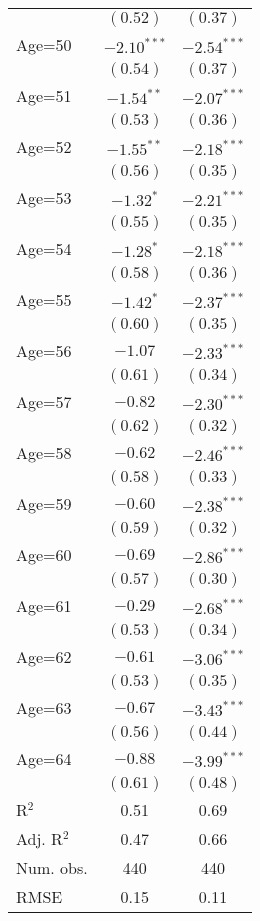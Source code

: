 \documentclass[fullpage]{paper}
\begin{document}
\begin{center}
\begin{longtable}{l c c }
            & $(0.52)$      & $(0.37)$      \\
Age=50      & $-2.10^{***}$ & $-2.54^{***}$ \\
            & $(0.54)$      & $(0.37)$      \\
Age=51      & $-1.54^{**}$  & $-2.07^{***}$ \\
            & $(0.53)$      & $(0.36)$      \\
Age=52      & $-1.55^{**}$  & $-2.18^{***}$ \\
            & $(0.56)$      & $(0.35)$      \\
Age=53      & $-1.32^{*}$   & $-2.21^{***}$ \\
            & $(0.55)$      & $(0.35)$      \\
Age=54      & $-1.28^{*}$   & $-2.18^{***}$ \\
            & $(0.58)$      & $(0.36)$      \\
Age=55      & $-1.42^{*}$   & $-2.37^{***}$ \\
            & $(0.60)$      & $(0.35)$      \\
Age=56      & $-1.07$       & $-2.33^{***}$ \\
            & $(0.61)$      & $(0.34)$      \\
Age=57      & $-0.82$       & $-2.30^{***}$ \\
            & $(0.62)$      & $(0.32)$      \\
Age=58      & $-0.62$       & $-2.46^{***}$ \\
            & $(0.58)$      & $(0.33)$      \\
Age=59      & $-0.60$       & $-2.38^{***}$ \\
            & $(0.59)$      & $(0.32)$      \\
Age=60      & $-0.69$       & $-2.86^{***}$ \\
            & $(0.57)$      & $(0.30)$      \\
Age=61      & $-0.29$       & $-2.68^{***}$ \\
            & $(0.53)$      & $(0.34)$      \\
Age=62      & $-0.61$       & $-3.06^{***}$ \\
            & $(0.53)$      & $(0.35)$      \\
Age=63      & $-0.67$       & $-3.43^{***}$ \\
            & $(0.56)$      & $(0.44)$      \\
Age=64      & $-0.88$       & $-3.99^{***}$ \\
            & $(0.61)$      & $(0.48)$      \\
\hline
R$^2$       & 0.51          & 0.69          \\
Adj. R$^2$  & 0.47          & 0.66          \\
Num. obs.   & 440           & 440           \\
RMSE        & 0.15          & 0.11          \\
\end{longtable}
\end{center}
\end{document}
